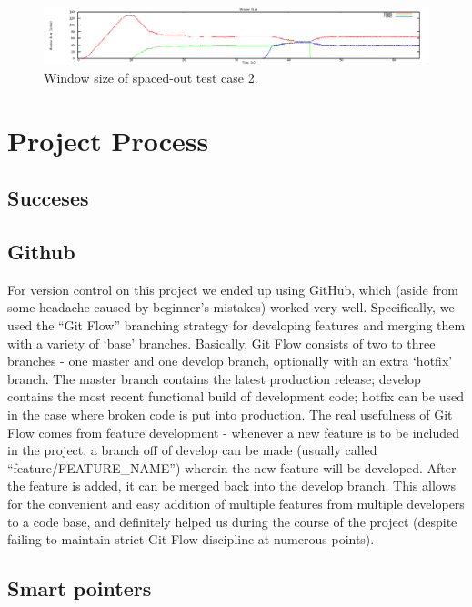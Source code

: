 \documentclass[12pt]{article}
\begin{document}
\begin{figure}[!ht]
\centering \includegraphics[bb= 0 0 1300 250, scale=.35]{figures/window_size_comparison.png}
\caption{Window size of spaced-out test case 2.}
\label{fig:window_size_comparison}
\end{figure}

\section{Project Process}
\subsection{Succeses}
\subsection*{Github}

For version control on this project we ended up using GitHub, which (aside from some headache caused by beginner’s
mistakes) worked very well. Specifically, we used the “Git Flow” branching strategy for developing features and merging 
them with a variety of ‘base’ branches. Basically, Git Flow consists of two to three branches - one master and one 
develop branch, optionally with an extra ‘hotfix’ branch. The master branch contains the latest production release; 
develop contains the most recent functional build of development code; hotfix can be used in the case where broken 
code is put into production. The real usefulness of Git Flow comes from feature development - whenever a new feature is 
to be included in the project, a branch off of develop can be made (usually called ``feature/FEATURE\_NAME'') wherein 
the new feature will be developed. After the feature is added, it can be merged back into the develop branch. This allows for the convenient and easy addition of multiple features from multiple developers to a code base, and definitely helped us during the course of the project (despite failing to maintain strict Git Flow discipline at numerous points).


\subsection*{Smart pointers}
\end{document}

